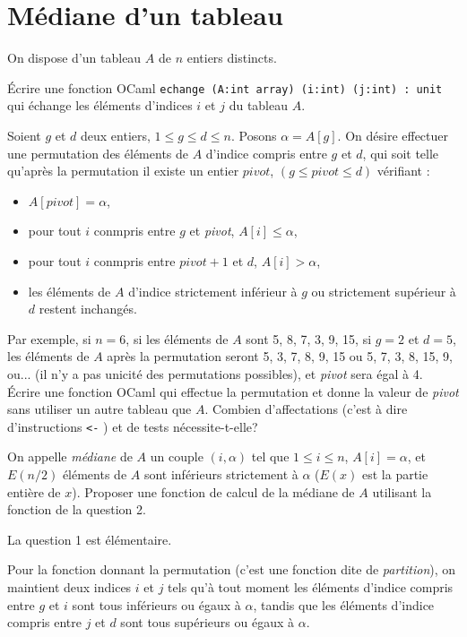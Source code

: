 \section{Médiane d'un tableau}

On dispose d'un tableau $A$ de $n$ entiers distincts.

\Q
Écrire une fonction OCaml \texttt{echange (A:int array) (i:int) (j:int) : unit} qui échange les éléments d'indices $i$ et $j$ du tableau $A$.

\Q
Soient $g$ et $d$ deux entiers, $1\leq g\leq d \leq n$. Posons $\alpha=A[g]$. On désire effectuer une permutation des éléments de $A$ d'indice compris entre $g$ et $d$, qui soit telle qu'après la permutation il existe un entier $pivot$, $(g\leq pivot \leq d)$ vérifiant :

\begin{itemize}
    \item $A[\textit{pivot}]=\alpha$,
    \item pour tout $i$ conmpris entre $g$ et \textit{pivot}, $A[i]\leq\alpha$,
    \item pour tout $i$ conmpris entre $\textit{pivot}+1$ et $d$, $A[i]>\alpha$,
    \item les éléments de $A$ d'indice strictement inférieur à $g$ ou strictement supérieur à $d$ restent inchangés.
\end{itemize}

Par exemple, si $n=6$, si les éléments de $A$ sont 5, 8, 7, 3, 9, 15, si $g=2$ et $d=5$, les éléments de $A$ après la permutation seront 5, 3, 7, 8, 9, 15 ou 5, 7, 3, 8, 15, 9, ou... (il n'y a pas unicité des permutations possibles), et \textit{pivot} sera égal à 4. Écrire une fonction OCaml qui effectue la permutation et donne la valeur de \textit{pivot} sans utiliser un autre tableau que $A$. Combien d'affectations (c'est à dire d'instructions \og \texttt{<-} \fg) et de tests nécessite-t-elle?

\Q
On appelle \textit{médiane} de $A$ un couple $(i,\alpha)$ tel que $1\leq i\leq n$, $A[i]=\alpha$, et $E(n/2)$ éléments de $A$ sont inférieurs strictement à $\alpha$ ($E(x)$ est la partie entière de $x$). Proposer une fonction de calcul de la médiane de $A$ utilisant la fonction de la question 2.

\Corrige
\Q
La question 1 est élémentaire.

\Q
Pour la fonction donnant la permutation (c'est une fonction dite de \textit{partition}), on maintient deux indices $i$ et $j$ tels qu'à tout moment les éléments d'indice compris entre $g$ et $i$ sont tous inférieurs ou égaux à $\alpha$, tandis que les éléments d'indice compris entre $j$ et $d$ sont tous supérieurs ou égaux à $\alpha$.